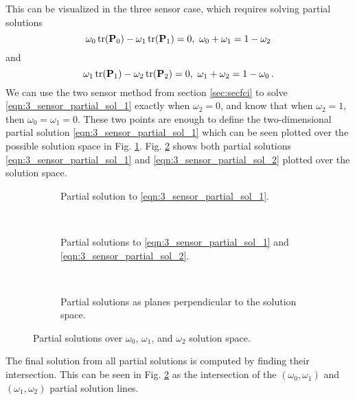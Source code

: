 \documentclass[letterpaper, 10 pt, conference]{ieeeconf}  %
\begin{document}
This can be visualized in the three sensor case, which requires solving partial solutions
\begin{equation}
   \omega_0 \operatorname{tr}({{\mathbf{P}}}_0) - \omega_1 \operatorname{tr}({{\mathbf{P}}}_1) = 0,\ \omega_0+\omega_1=1-\omega_2 \label{eqn:3_sensor_partial_sol_1}
\end{equation}
and
\begin{equation}
   \omega_1 \tr(\mP_1) - \omega_2 \tr(\mP_2) = 0,\ \omega_1+\omega_2=1-\omega_0\,. \label{eqn:3_sensor_partial_sol_2}
\end{equation}
We can use the two sensor method from section \ref{sec:secfci} to solve \eqref{eqn:3_sensor_partial_sol_1} exactly when $\omega_2=0$, and know that when $\omega_2=1$, then $\omega_0=\omega_1=0$. These two points are enough to define the two-dimensional partial solution \eqref{eqn:3_sensor_partial_sol_1} which can be seen plotted over the possible solution space in Fig. \ref{fig:3_sensor_partial_sol}. Fig. \ref{fig:3_sensor_partial_sols} shows both partial solutions \eqref{eqn:3_sensor_partial_sol_1} and \eqref{eqn:3_sensor_partial_sol_2} plotted over the solution space.
\begin{figure*}[tb]
   \begin{subfigure}[t]{0.3\textwidth}
      \begin{center}
         
      \end{center}
      \caption{Partial solution to \eqref{eqn:3_sensor_partial_sol_1}.}
      \label{fig:3_sensor_partial_sol}
   \end{subfigure}
   ~
   \begin{subfigure}[t]{0.3\textwidth}
      \begin{center}
         
      \end{center}
      \caption{Partial solutions to \eqref{eqn:3_sensor_partial_sol_1} and \eqref{eqn:3_sensor_partial_sol_2}.}
      \label{fig:3_sensor_partial_sols}
   \end{subfigure}
   ~
   \begin{subfigure}[t]{0.3\textwidth}
      \begin{center}
         
      \end{center}
      \caption{Partial solutions as planes perpendicular to the solution space.}
      \label{fig:3sen_planes}
   \end{subfigure}
   \caption{Partial solutions over $\omega_0$, $\omega_1$, and $\omega_2$ solution space.}
   \vspace{-\baselineskip}
   \label{fig:partial_sols_and_planes}
\end{figure*}
The final solution from all partial solutions is computed by finding their intersection. This can be seen in Fig. \ref{fig:3_sensor_partial_sols} as the intersection of the $(\omega_0,\omega_1)$ and $(\omega_1,\omega_2)$ partial solution lines.
\end{document}

